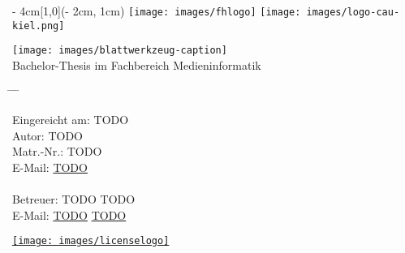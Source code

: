 
\begin{titlepage}
  \vspace*{20ex}
  \begin{textblock*}{\paperwidth - 4cm}[1,0](\paperwidth - 2cm, 1cm)
    \centering
    \texttt{[image: images/fhlogo]}
    \hfill
    \texttt{[image: images/logo-cau-kiel.png]}
  \end{textblock*}
  \begin{center}
    \sffamily{}
    \texttt{[image: images/blattwerkzeug-caption]} \\[2ex]
    {Bachelor-Thesis im Fachbereich Medieninformatik}
  \end{center}
  \vspace*{10ex}
  \begin{tabbing}
    \hspace{8em} \= \hspace{14em} \= \hspace{8em} \= \kill

    Eingereicht am: \> TODO \\[5ex]
    Autor: \> TODO \\
    Matr.-Nr.: \> TODO \\
    E-Mail: \> \href{mailto:TODO}{TODO} \\

    \\
    Betreuer: \> TODO \> TODO \\
    E-Mail: \> \href{mailto:TODO}{TODO} \> \href{mailto:TODO}{TODO}
  \end{tabbing}
  \vfill
  \centering \href{https://creativecommons.org/licenses/by-sa/4.0/}{\texttt{[image: images/licenselogo]}}
\end{titlepage}

\restoregeometry                 %

\cleardoublepage

